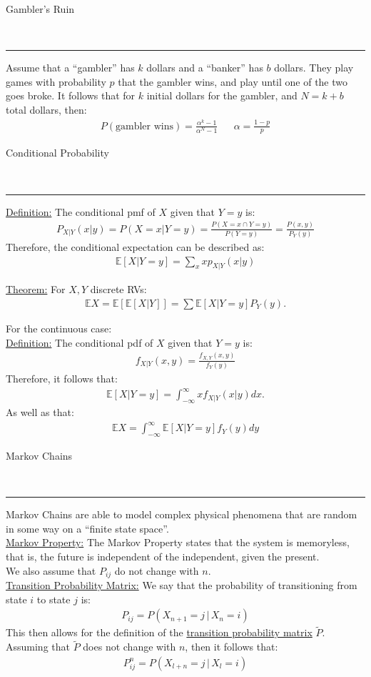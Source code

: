 \documentclass{article}
\newcommand{\header}[1]{\begin{large}\noindent #1\end{large}\\\rule{\textwidth}{0.5pt}}
\newcommand{\sheader}[1]{\underline{#1:}}
\newcommand{\gap}{\medskip\\}
\begin{document}
\pagebreak

\header{Gambler's Ruin}

Assume that a ``gambler'' has $k$ dollars and a ``banker'' has $b$ dollars.
They play games with probability $p$ that the gambler wins, and play 
until one of the two goes broke. It follows that for $k$ initial dollars
for the gambler, and $N = k + b$ total dollars, then:
\begin{align*}
    P(\textrm{gambler wins}) = \frac{\alpha^k - 1}{\alpha^N - 1} && \alpha = \frac{1-p}{p}
\end{align*}

\header{Conditional Probability}
\sheader{Definition} The conditional pmf of $X$ given that $Y=y$ is:
\begin{align*}
    P_{X|Y}(x | y) = P(X=x | Y=y) = \frac{P(X = x \cap Y = y)}{P(Y = y)} = \frac{P(x, y)}{P_Y(y)}
\end{align*}
Therefore, the conditional expectation can be described as:
\begin{align*}
    \mathbb{E}[X|Y = y] = \sum_{x}xp_{X|Y}(x|y)
\end{align*}

\sheader{Theorem} For $X, Y$ discrete RVs:
\begin{align*}
    \mathbb{E}X = \mathbb{E}\left[\mathbb{E}[X|Y]\right] = \sum \mathbb{E}\left[X | Y = y\right]P_Y(y).
\end{align*}

For the continuous case:
\gap
\sheader{Definition} The conditional pdf of $X$ given that $Y =y$ is:
\begin{align*}
    f_{X|Y}(x, y) = \frac{f_{X, Y}(x, y)}{f_Y(y)}
\end{align*}
Therefore, it follows that:
\begin{align*}
    \mathbb{E}[X|Y = y] = \int_{-\infty}^{\infty}xf_{X|Y}(x|y)dx.
\end{align*}
As well as that:
\begin{align*}
    \mathbb{E}X = \int_{-\infty}^{\infty}\mathbb{E}[X|Y=y]f_Y(y)dy
\end{align*}

\header{Markov Chains}

Markov Chains are able to model complex physical phenomena that are 
random in some way on a ``finite state space''.
\gap 
\sheader{Markov Property} The Markov Property states that the 
system is memoryless, that is, the future is independent of the independent, 
given the present.
\gap
We also assume that $P_{ij}$ do not change with $n$.
\gap
\sheader{Transition Probability Matrix} We say that the probability 
of transitioning from state $i$ to state $j$ is:
\begin{align*}
    P_{ij} = P(X_{n+1} = j \,|\, X_n = i)
\end{align*}
This then allows for the definition of the \underline{transition probability matrix} $\widetilde{P}$.
\gap 
Assuming that $\widetilde{P}$ does not change with $n$, then it follows 
that: 
\begin{align*}
    P_{ij}^n = P(X_{l + n}=j \,|\, X_l = i)
\end{align*}
\end{document}
